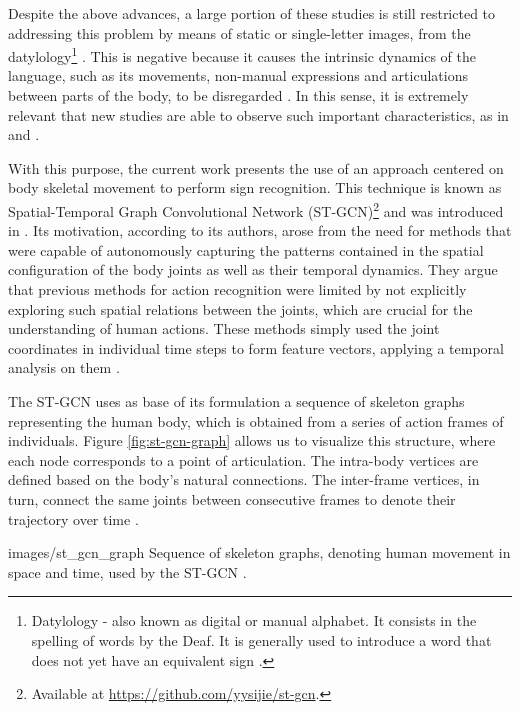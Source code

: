 Despite the above advances, a large portion of these studies is still restricted to addressing this problem by means of static or single-letter images, from the datylology\footnote{
     Datylology - also known as digital or manual alphabet. It consists in the spelling of words by the Deaf. It is generally used to introduce a word that does not yet have an equivalent sign \cite{quadros-2004, pereira-choi-2011}.
} \cite{shanta-2018, taskiran-2018, elbadawy-2017, das-2018, sajanraj-2018}. This is negative because it causes the intrinsic dynamics of the language, such as its movements, non-manual expressions and articulations between parts of the body, to be disregarded \cite{quadros-2004}. In this sense, it is extremely relevant that new studies are able to observe such important characteristics, as in \cite{konstantinidis-2018} and \cite {pigou-2017}.

With this purpose, the current work presents the use of an approach centered on body skeletal movement to perform sign recognition. This technique is known as Spatial-Temporal Graph Convolutional Network (ST-GCN)\footnote {
    Available at \url{https://github.com/yysijie/st-gcn}.
} and was introduced in \cite{st-gcn-2018}. Its motivation, according to its authors, arose from the need for methods that were capable of autonomously capturing the patterns contained in the spatial configuration of the body joints as well as their temporal dynamics. They argue that previous methods for action recognition were limited by not explicitly exploring such spatial relations between the joints, which are crucial for the understanding of human actions. These methods simply used the joint coordinates in individual time steps to form feature vectors, applying a temporal analysis on them \cite{st-gcn-2018, wang-2012, fernando-2015}.

The ST-GCN uses as base of its formulation a sequence of skeleton graphs representing the human body, which is obtained from a series of action frames of individuals. Figure \ref{fig:st-gcn-graph} allows us to visualize this structure, where each node corresponds to a point of articulation. The intra-body vertices are defined based on the body's natural connections. The inter-frame vertices, in turn, connect the same joints between consecutive frames to denote their trajectory over time \cite{st-gcn-2018}.

    {images/st_gcn_graph}
    {Sequence of skeleton graphs, denoting human movement in space and time, used by the ST-GCN \cite[p. 1]{st-gcn-2018}.}


